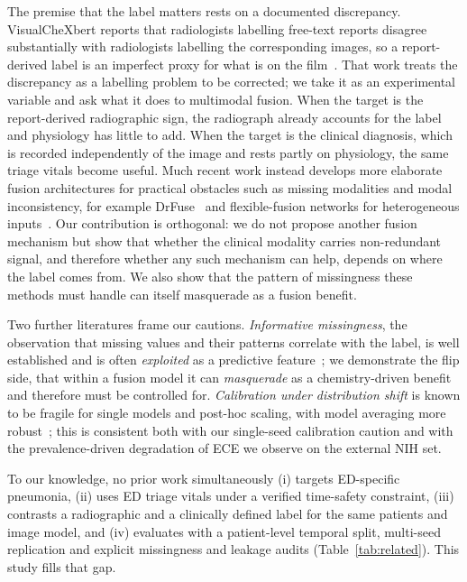 \documentclass[twocolumn, final]{svjour3}
\begin{document}
The premise that the label matters rests on a documented discrepancy. VisualCheXbert
reports that radiologists labelling free-text reports disagree substantially with
radiologists labelling the corresponding images, so a report-derived label is an imperfect
proxy for what is on the film~\citep{jain2021visualchexbert}. That work treats the
discrepancy as a labelling problem to be corrected; we take it as an experimental variable
and ask what it does to multimodal fusion. When the target is the report-derived
radiographic sign, the radiograph already accounts for the label and physiology has little
to add. When the target is the clinical diagnosis, which is recorded independently of the
image and rests partly on physiology, the same triage vitals become useful. Much recent
work instead develops more elaborate fusion architectures for practical obstacles such as
missing modalities and modal inconsistency, for example DrFuse~\citep{yao2024drfuse} and
flexible-fusion networks for heterogeneous inputs~\citep{hemker2024healnet}. Our
contribution is orthogonal: we do not propose another fusion mechanism but show that
whether the clinical modality carries non-redundant signal, and therefore whether any such
mechanism can help, depends on where the label comes from. We also show that the pattern of
missingness these methods must handle can itself masquerade as a fusion benefit.

Two further literatures frame our cautions. \emph{Informative missingness}, the
observation that missing values and their patterns correlate with the label, is well
established and is often \emph{exploited} as a predictive feature~\citep{che2018recurrent};
we demonstrate the flip side, that within a fusion model it can \emph{masquerade} as a
chemistry-driven benefit and therefore must be controlled for. \emph{Calibration under
distribution shift} is known to be fragile for single models and post-hoc scaling,
with model averaging more robust~\citep{ovadia2019trust}; this is consistent both with
our single-seed calibration caution and with the prevalence-driven degradation of ECE
we observe on the external NIH set.

To our knowledge, no prior work simultaneously (i) targets ED-specific pneumonia,
(ii) uses ED triage vitals under a verified time-safety constraint, (iii) contrasts a
radiographic and a clinically defined label for the same patients and image model, and
(iv) evaluates with a patient-level temporal split, multi-seed replication and explicit
missingness and leakage audits (Table~\ref{tab:related}). This study fills that gap.
\end{document}
